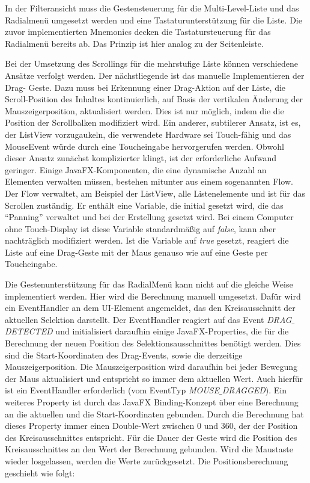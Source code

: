 In der Filteransicht muss die Gestensteuerung für die Multi-Level-Liste und das Radialmenü umgesetzt werden und eine Tastaturunterstützung für die Liste. Die zuvor implementierten Mnemonics decken die Tastatursteuerung für das Radialmenü bereits ab. Das Prinzip ist hier analog zu der Seitenleiste. \par
Bei der Umsetzung des Scrollings für die mehrstufige Liste können verschiedene Ansätze verfolgt werden. Der nächstliegende ist das manuelle Implementieren der Drag- Geste. Dazu muss bei Erkennung einer Drag-Aktion auf der Liste, die Scroll-Position des Inhaltes kontinuierlich, auf Basis der vertikalen Änderung der Mauszeigerposition, aktualisiert werden. Dies ist nur möglich, indem die die Position der Scrollbalken modifiziert wird. Ein anderer, subtilerer Ansatz, ist es, der ListView vorzugaukeln, die verwendete Hardware sei Touch-fähig und das MouseEvent würde durch eine Toucheingabe hervorgerufen werden. Obwohl dieser Ansatz zunächst komplizierter klingt, ist der erforderliche Aufwand geringer. Einige JavaFX-Komponenten, die eine dynamische Anzahl an Elementen verwalten müssen, bestehen mitunter aus einem sogenannten Flow. Der Flow verwaltet, am Beispiel der ListView, alle Listenelemente und ist für das Scrollen zuständig. Er enthält eine Variable, die initial gesetzt wird, die das \enquote{Panning} verwaltet und bei der Erstellung gesetzt wird. Bei einem Computer ohne Touch-Display ist diese Variable standardmäßig auf \textit{false}, kann aber nachträglich modifiziert werden. Ist die Variable auf \textit{true} gesetzt, reagiert die Liste auf eine Drag-Geste mit der Maus genauso wie auf eine Geste per Toucheingabe.\par
Die Gestenunterstützung für das RadialMenü kann nicht auf die gleiche Weise implementiert werden. Hier wird die Berechnung manuell umgesetzt. Dafür wird ein EventHandler an dem UI-Element angemeldet, das den Kreisausschnitt der aktuellen Selektion darstellt. Der EventHandler reagiert auf das Event \textit{DRAG$\_$DETECTED} und initialisiert daraufhin einige JavaFX-Properties, die für die Berechnung der neuen Position des Selektionsausschnittes benötigt werden. Dies sind die Start-Koordinaten des Drag-Events, sowie die derzeitige Mauszeigerposition. Die Mauszeigerposition wird daraufhin bei jeder Bewegung der Maus aktualisiert und entspricht so immer dem aktuellen Wert. Auch hierfür ist ein EventHandler erforderlich (vom EventTyp \textit{MOUSE$\_$DRAGGED}). Ein weiteres Property ist durch das JavaFX Binding-Konzept über eine Berechnung an die aktuellen und die Start-Koordinaten gebunden. Durch die Berechnung hat dieses Property immer einen Double-Wert zwischen 0 und 360, der der Position des Kreisausschnittes entspricht. Für die Dauer der Geste wird die Position des Kreisausschnittes an den Wert der Berechnung gebunden. Wird die Maustaste wieder losgelassen, werden die Werte zurückgesetzt. Die Positionsberechnung geschieht wie folgt:\par
